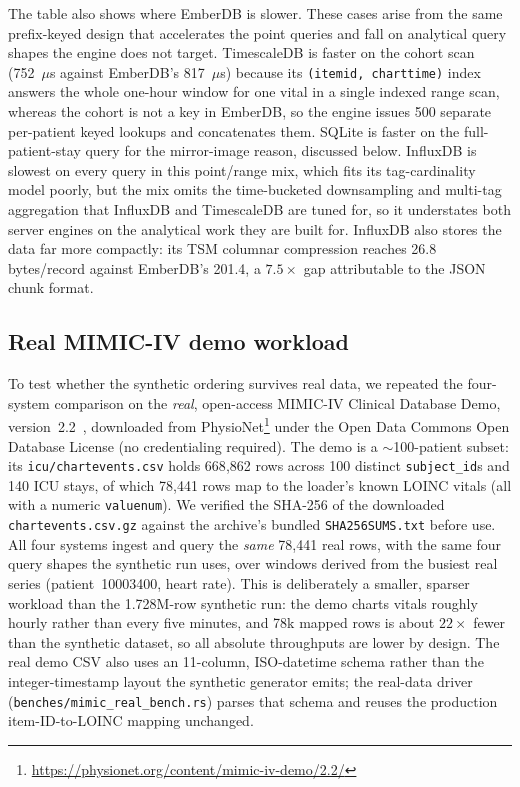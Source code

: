 \documentclass[journal]{IEEEtran}
\begin{document}
The table also shows where EmberDB is slower. These cases arise from the same prefix-keyed design that accelerates the point queries and fall on analytical query shapes the engine does not target. TimescaleDB is faster on the cohort scan (752~$\mu$s against EmberDB's 817~$\mu$s) because its \texttt{(itemid, charttime)} index answers the whole one-hour window for one vital in a single indexed range scan, whereas the cohort is not a key in EmberDB, so the engine issues 500 separate per-patient keyed lookups and concatenates them. SQLite is faster on the full-patient-stay query for the mirror-image reason, discussed below. InfluxDB is slowest on every query in this point/range mix, which fits its tag-cardinality model poorly, but the mix omits the time-bucketed downsampling and multi-tag aggregation that InfluxDB and TimescaleDB are tuned for, so it understates both server engines on the analytical work they are built for. InfluxDB also stores the data far more compactly: its TSM columnar compression reaches 26.8 bytes/record against EmberDB's 201.4, a $7.5\times$ gap attributable to the JSON chunk format.

\subsection{Real MIMIC-IV demo workload}
\label{sec:eval-real}

To test whether the synthetic ordering survives real data, we repeated the four-system comparison on the \emph{real}, open-access MIMIC-IV Clinical Database Demo, version~2.2~\cite{mimicivdemo}, downloaded from PhysioNet\footnote{\url{https://physionet.org/content/mimic-iv-demo/2.2/}} under the Open Data Commons Open Database License (no credentialing required). The demo is a $\sim$100-patient subset: its \texttt{icu/chartevents.csv} holds 668{,}862 rows across 100 distinct \texttt{subject\_id}s and 140 ICU stays, of which 78{,}441 rows map to the loader's known LOINC vitals (all with a numeric \texttt{valuenum}). We verified the SHA-256 of the downloaded \texttt{chartevents.csv.gz} against the archive's bundled \texttt{SHA256SUMS.txt} before use. All four systems ingest and query the \emph{same} 78{,}441 real rows, with the same four query shapes the synthetic run uses, over windows derived from the busiest real series (patient~10003400, heart rate). This is deliberately a smaller, sparser workload than the 1.728M-row synthetic run: the demo charts vitals roughly hourly rather than every five minutes, and 78k mapped rows is about $22\times$ fewer than the synthetic dataset, so all absolute throughputs are lower by design. The real demo CSV also uses an 11-column, ISO-datetime schema rather than the integer-timestamp layout the synthetic generator emits; the real-data driver (\texttt{benches/mimic\_real\_bench.rs}) parses that schema and reuses the production item-ID-to-LOINC mapping unchanged.
\end{document}
